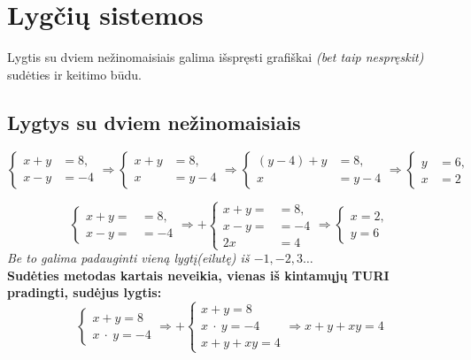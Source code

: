 \documentclass[fleqn]{article} %
\begin{document}
\section{Lygčių sistemos}

Lygtis su dviem nežinomaisiais galima išspręsti grafiškai \textit{(bet taip nespręskit)} sudėties ir keitimo būdu.

\subsection{Lygtys su dviem nežinomaisiais}
\begin{equation}
    \begin{cases}
        x + y &= 8, \\
        x - y &= -4
    \end{cases}
    \Rightarrow
    \begin{cases}
        x + y &= 8, \\
        x     &= y - 4
    \end{cases}
    \Rightarrow
    \begin{cases}
        (y - 4) + y &= 8, \\
        x           &= y - 4
    \end{cases}
    \Rightarrow
    \begin{cases}
        y &= 6, \\
        x &= 2
    \end{cases}
\end{equation}

\begin{equation}
    \begin{cases}
        x + y = &= 8, \\
        x - y = &= -4
    \end{cases}
    \Rightarrow +
    \begin{cases}
        x + y = &= 8, \\
        x - y = &= -4 \\
        \hline
        2x &= 4 
    \end{cases}
    \Rightarrow
    \begin{cases}
        x = 2, \\
        y = 6
    \end{cases}
\end{equation}
\textit{Be to galima padauginti vieną lygtį(eilutę) iš $-1, -2, 3 \dots$} \\
\textbf{Sudėties metodas kartais neveikia, vienas iš kintamųjų TURI pradingti, sudėjus lygtis:}
\begin{equation}
    \begin{cases}
        x + y = 8 \\
        x\ \cdot\ y = -4  
    \end{cases}
    \Rightarrow +
    \begin{cases}
        x + y = 8 \\
        x\ \cdot\ y = -4 \\
        \hline
        x + y + xy = 4
    \end{cases}
    \Rightarrow
    x + y + xy = 4
\end{equation}
\end{document}
